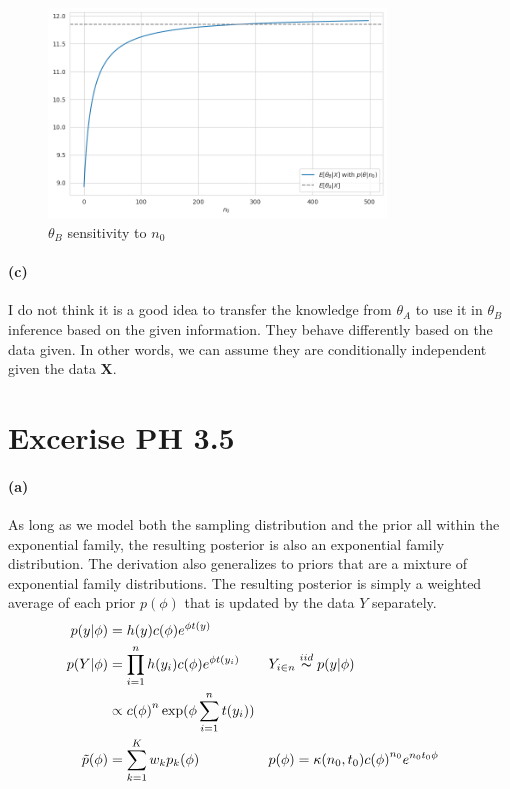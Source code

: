 \documentclass[11pt, letterpaper]{article}
\begin{document}
\begin{figure}[!h]
  \centering
  \includegraphics[width=0.8\textwidth]{3.3.b.png}
  \captionsetup{justification=centering}
  \caption{$\theta_B$ sensitivity to $n_0$}
\end{figure}

\paragraph{(c)}
I do not think it is a good idea to transfer the knowledge from $\theta_A$ to use it in $\theta_B$ inference
based on the given information. They behave differently based on the data given. In other words,
we can assume they are conditionally independent given the data $\mathbf{X}$.
\newpage


\section{Excerise PH 3.5}
\paragraph{(a)}
As long as we model both the sampling distribution and the prior all within the exponential family, the resulting
posterior is also an exponential family distribution. The derivation also generalizes to priors that are
a mixture of exponential family distributions. The resulting posterior is simply a weighted average
of each prior $p(\phi)$ that is updated by the data $Y$ separately.
\begin{align*}
  p(y|\phi) &= h(y)c(\phi)e^{\phi t(y)} \\
  p(Y|\phi) &= \prod_{i=1}^{n} h(y_i)c(\phi)e^{\phi t(y_i)} && Y_{i \in n} \overset{iid}{\thicksim} p(y|\phi) \\
    &\propto {c(\phi)}^{n} \exp(\phi \sum_{i=1}^{n} t(y_i)) \\
  \tilde{p}(\phi) &= \sum_{k=1}^{K} w_k p_k(\phi) && p(\phi) = \kappa(n_0, t_0) {c(\phi)}^{n_0} e^{n_0 t_0 \phi}
\end{align*}
\end{document}
